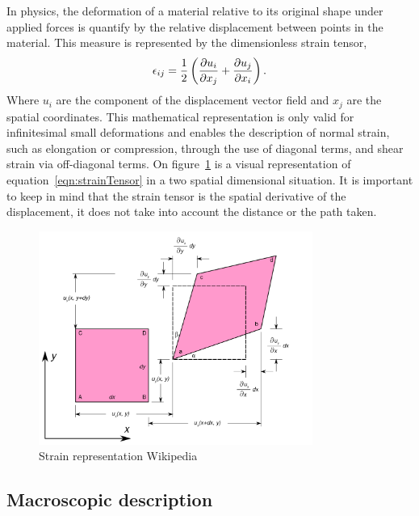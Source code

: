 In physics, the deformation of a material relative to its original shape under applied forces is quantify by the relative displacement between points in the material.
This measure is represented by the dimensionless strain tensor,
\begin{gather}
    \epsilon_{ij} = \frac{1}{2}\left( \pdv{u_i}{x_j}+\pdv{u_j}{x_i} \right).\label{eqn:strainTensor}
\end{gather}
Where $u_i$ are the component of the displacement vector field and $x_j$ are the spatial coordinates.
This mathematical representation is only valid for infinitesimal small deformations and enables the description of normal strain, such as elongation or compression, through the use of diagonal terms, and shear strain via off-diagonal terms.
On figure~\ref{fig:strainTensor} is a visual representation of equation~\eqref{eqn:strainTensor} in a two spatial dimensional situation.
It is important to keep in mind that the strain tensor is the spatial derivative of the displacement, it does not take into account the distance or the path taken.

\begin{figure}[ht!]
    \centering
    \includegraphics[width=0.8\textwidth]{figs/2D_geometric_strain.png}
    \caption{Strain representation Wikipedia}\label{fig:strainTensor}
\end{figure}

\subsection{Macroscopic description}

